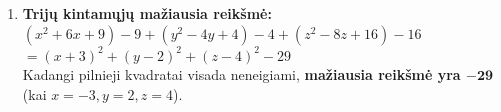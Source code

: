 \documentclass[12pt,a4paper]{article}
\begin{document}
\begin{enumerate}
    \vspace{0.3cm}
    \item \textbf{Trijų kintamųjų mažiausia reikšmė:} \\
    $(x^2 + 6x + 9) - 9 + (y^2 - 4y + 4) - 4 + (z^2 - 8z + 16) - 16$ \\
    $= (x+3)^2 + (y-2)^2 + (z-4)^2 - 29$ \\
    Kadangi pilnieji kvadratai visada neneigiami, \textbf{mažiausia reikšmė yra $\mathbf{-29}$} (kai $x=-3, y=2, z=4$).

\end{enumerate}
\end{document}
